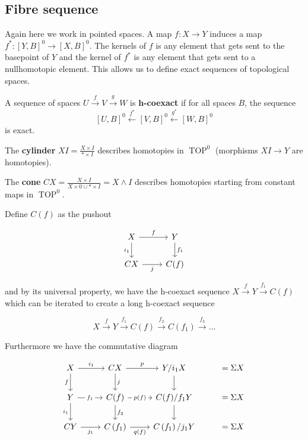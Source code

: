 \documentclass[12pt]{article}
\DeclareMathOperator{\TOP}{TOP}
\begin{document}
\subsection{Fibre sequence}

Again here we work in pointed spaces. A map $f:X\to Y$ induces a map $f^*:[Y,B]^0\to[X,B]^0$. The kernels of $f$ is any element that gets sent to the basepoint of $Y$ and the kernel of $f^*$ is any element that gets sent to a nullhomotopic element. This allows us to define exact sequences of topological spaces.

A sequence of spaces $U\overset f\to V\overset g\to W$ is \textbf{h-coexact} if for all spaces $B$, the sequence
\[[U,B]^0\overset{f^*}\leftarrow[V,B]^0\overset{g^*}\leftarrow[W,B]^0\]
is exact.

The \textbf{cylinder} $XI=\frac{X\times I}{*\times I}$ describes homotopies in $\TOP^0$ (morphisms $XI\to Y$ are homotopies).

The \textbf{cone} $CX=\frac{X\times I}{X\times 0\cup*\times I}=X\wedge I$ describes homotopies starting from constant maps in $\TOP^0$.

Define $C(f)$ as the pushout

\[\begin{tikzcd}
	X & Y \\
	CX & {C(f)}
	\arrow["f", from=1-1, to=1-2]
	\arrow["{i_1}"', from=1-1, to=2-1]
	\arrow["j"', from=2-1, to=2-2]
	\arrow["{f_1}", from=1-2, to=2-2]
\end{tikzcd}\]

and by its universal property, we have the h-coexact sequence $X\overset f\to Y\overset{f_1}\to C(f)$ which can be iterated to create a long h-coexact sequence

\[X\overset f\to Y\overset{f_1}\to C(f)\overset{f_2}\to C\left(f_1\right)\overset{f_3}\to\dots\]

Furthermore we have the commutative diagram

\[\begin{tikzcd}
	X & CX & {Y/i_1X} & {=\Sigma X} \\
	Y & {C(f)} & {C(f)/f_1Y} & {=\Sigma X} \\
	CY & {C\left(f_1\right)} & {C\left(f_1\right)/j_1Y} & {=\Sigma X}
	\arrow["{i_1}", from=1-1, to=1-2]
	\arrow["f"', from=1-1, to=2-1]
	\arrow["{f_1}"{description}, from=2-1, to=2-2]
	\arrow["j", from=1-2, to=2-2]
	\arrow["{i_1}"', from=2-1, to=3-1]
	\arrow["{f_2}", from=2-2, to=3-2]
	\arrow["{j_1}"', from=3-1, to=3-2]
	\arrow["p", from=1-2, to=1-3]
	\arrow["{p(f)}"{description}, from=2-2, to=2-3]
	\arrow["{q(f)}"', from=3-2, to=3-3]
	\arrow[from=1-3, to=2-3]
	\arrow[from=2-3, to=3-3]
\end{tikzcd}\]
\end{document}
